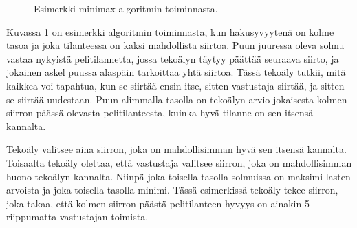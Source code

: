 \begin{figure}
\center
{}
\caption{Esimerkki minimax-algoritmin toiminnasta.}
\label{fig:minmax}
\end{figure}

Kuvassa \ref{fig:minmax} on esimerkki algoritmin toiminnasta,
kun hakusyvyytenä on kolme tasoa ja
joka tilanteessa on kaksi mahdollista siirtoa.
Puun juuressa oleva solmu vastaa nykyistä pelitilannetta,
jossa tekoälyn täytyy päättää seuraava siirto,
ja jokainen askel puussa alaspäin tarkoittaa yhtä siirtoa.
Tässä tekoäly tutkii, mitä kaikkea voi tapahtua,
kun se siirtää ensin itse, sitten vastustaja siirtää,
ja sitten se siirtää uudestaan.
Puun alimmalla tasolla on tekoälyn arvio jokaisesta
kolmen siirron päässä olevasta pelitilanteesta,
kuinka hyvä tilanne on sen itsensä kannalta.

Tekoäly valitsee aina siirron,
joka on mahdollisimman hyvä sen itsensä kannalta.
Toisaalta tekoäly olettaa, että vastustaja valitsee siirron,
joka on mahdollisimman huono tekoälyn kannalta.
Niinpä joka toisella tasolla solmuissa on maksimi lasten arvoista
ja joka toisella tasolla minimi.
Tässä esimerkissä tekoäly tekee siirron,
joka takaa, että kolmen siirron päästä pelitilanteen hyvyys on ainakin 5
riippumatta vastustajan toimista.

